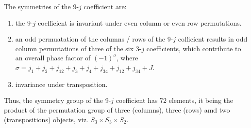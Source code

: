 The symmetries of the 9-$j$ coefficient are:
\begin{enumerate}
\item the 9-$j$ coefficient is invariant under even column or even row permutations.
\item an odd permuatation of the columns / rows of the 9-$j$ cofficient results in odd column
permutations of three of the six 3-$j$ coefficients, which contribute to an overall phase
factor of $(-1)^\sigma $, where $\sigma = j_1+j_2+j_{12}+j_3+j_4+j_{34}+j_{12}+j_{34}+J$.
\item invariance under transposition.
\end{enumerate}

Thus, the symmetry group of the 9-$j$ coefficient has 72 elements, it being the product of 
the permutation group of three (columns), three (rows) amd two (transpositions) objects, viz.
$S_3 \times  S_3 \times S_2$.

